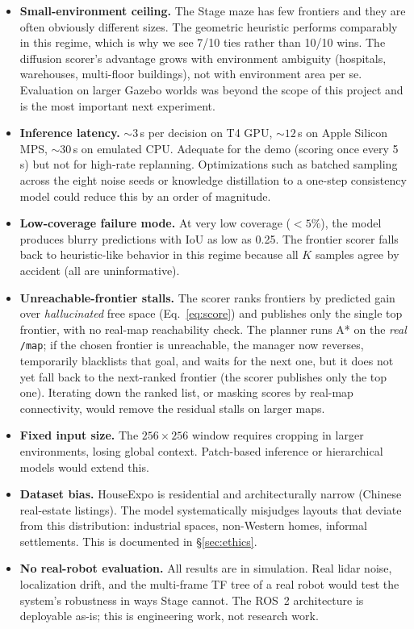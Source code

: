\documentclass[conference]{IEEEtran}
\begin{document}
\begin{itemize}
  \item \textbf{Small-environment ceiling.} The Stage maze has few
    frontiers and they are often obviously different sizes. The
    geometric heuristic performs comparably in this regime, which is why we
    see 7/10 ties rather than 10/10 wins. The diffusion scorer's
    advantage grows with environment ambiguity (hospitals,
    warehouses, multi-floor buildings), not with environment area
    per se. Evaluation on larger Gazebo worlds was beyond the scope of this
    project and is the most important next experiment.
  \item \textbf{Inference latency.} $\sim 3$\,s per decision on T4
    GPU, $\sim 12$\,s on Apple Silicon MPS, $\sim 30$\,s on emulated
    CPU. Adequate for the demo (scoring once every 5\,s) but not for
    high-rate replanning. Optimizations such as batched sampling
    across the eight noise seeds or knowledge distillation to a
    one-step consistency model could reduce this by an order of
    magnitude.
  \item \textbf{Low-coverage failure mode.} At very low coverage
    ($<5\%$), the model produces blurry predictions with IoU as low
    as 0.25. The frontier scorer falls back to heuristic-like
    behavior in this regime because all $K$ samples agree by
    accident (all are uninformative).
  \item \textbf{Unreachable-frontier stalls.} The scorer ranks
    frontiers by predicted gain over \emph{hallucinated} free space
    (Eq.~\ref{eq:score}) and publishes only the single top frontier,
    with no real-map reachability check. The planner runs A* on the
    \emph{real} \texttt{/map}; if the chosen frontier is unreachable,
    the manager now reverses, temporarily blacklists that goal, and
    waits for the next one, but it does not yet fall back to the
    next-ranked frontier (the scorer publishes only the top one).
    Iterating down the ranked list, or masking scores by real-map
    connectivity, would remove the residual stalls on larger maps.
  \item \textbf{Fixed input size.} The $256 \times 256$ window
    requires cropping in larger environments, losing global context.
    Patch-based inference or hierarchical models would extend this.
  \item \textbf{Dataset bias.} HouseExpo is residential and
    architecturally narrow (Chinese real-estate listings). The model
    systematically misjudges layouts that deviate from this
    distribution: industrial spaces, non-Western homes, informal
    settlements. This is documented in \S\ref{sec:ethics}.
  \item \textbf{No real-robot evaluation.} All results are in
    simulation. Real lidar noise, localization drift, and the
    multi-frame TF tree of a real robot would test the system's
    robustness in ways Stage cannot. The ROS~2 architecture is
    deployable as-is; this is engineering work, not research work.
\end{itemize}
\end{document}
